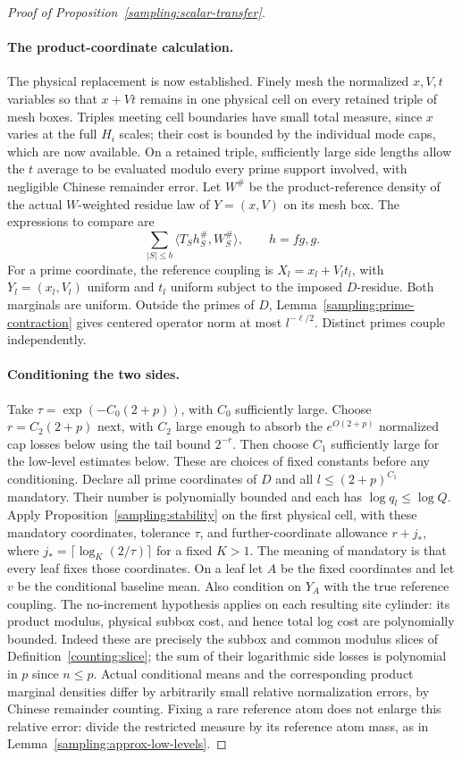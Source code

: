 \begin{proof}[Proof of Proposition~\ref{sampling:scalar-transfer}]
\paragraph{The product-coordinate calculation.}
The physical replacement is now established. Finely mesh the normalized
$x,V,t$ variables so that
$x+Vt$ remains in one physical cell on every retained triple of mesh
boxes.  Triples meeting cell boundaries have small total measure, since
$x$ varies at the full $H_i$ scales; their cost is bounded by the individual
mode caps, which are now available.  On a retained triple, sufficiently
large side lengths allow the $t$ average to be evaluated modulo every
prime support involved, with negligible Chinese remainder error.  Let
$W^\#$ be the product-reference density of the actual $W$-weighted residue
law of $Y=(x,V)$ on its mesh box.  The expressions to compare are
\begin{equation}\label{sampling:bilinear-levels}
 \sum_{|S|\le b}\langle T_Sh^\#_S,W^\#_S\rangle,
 \qquad h=fg,g.
\end{equation}
For a prime coordinate, the reference coupling is
$X_l=x_l+V_lt_l$, with $Y_l=(x_l,V_l)$ uniform and $t_l$ uniform subject
to the imposed $D$-residue.  Both marginals are uniform.  Outside the primes
of $D$, Lemma~\ref{sampling:prime-contraction} gives centered operator norm
at most $l^{-\ell/2}$.  Distinct primes couple independently.

\paragraph{Conditioning the two sides.}
Take $\tau=\exp(-C_0(2+p))$, with $C_0$ sufficiently large.
Choose $r=C_2(2+p)$ next, with $C_2$ large enough to absorb the
$e^{O(2+p)}$ normalized cap losses below using the tail bound $2^{-r}$.
Then choose $C_1$ sufficiently large for the low-level estimates below.
These are choices of fixed constants before any conditioning.
Declare all prime coordinates of $D$ and all $l\le(2+p)^{C_1}$ mandatory.
Their number is polynomially bounded and each has $\log q_l\le\log Q$.
Apply Proposition~\ref{sampling:stability} on the first physical cell,
with these mandatory coordinates, tolerance $\tau$, and further-coordinate
allowance $r+j_*$, where
$j_* = \lceil\log_K(2/\tau)\rceil$ for a fixed $K>1$.
The meaning of mandatory is that every leaf fixes those coordinates.
On a
leaf let $A$ be the fixed coordinates and let $v$ be the conditional
baseline mean.  Also condition on $Y_A$ with the true reference coupling.
The no-increment hypothesis applies on each resulting site cylinder:
its product modulus, physical subbox cost, and hence total log cost are
polynomially bounded.  Indeed these are precisely the subbox and common
modulus slices of Definition~\ref{counting:slice}; the sum of their
logarithmic side losses is polynomial in $p$ since $n\le p$.
Actual conditional means and the corresponding product marginal densities
differ by arbitrarily small relative normalization errors, by Chinese
remainder counting.  Fixing a rare reference atom does not enlarge this
relative error: divide the restricted measure by its reference atom mass,
as in Lemma~\ref{sampling:approx-low-levels}.


\end{proof}
